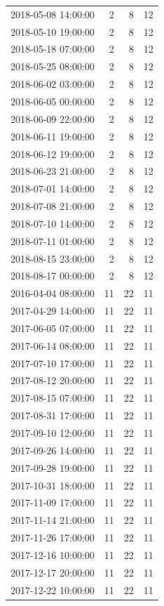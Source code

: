 \begin{tabular}{lrrr}
2018-05-08 14:00:00 & 2 & 8 & 12 \\
2018-05-10 19:00:00 & 2 & 8 & 12 \\
2018-05-18 07:00:00 & 2 & 8 & 12 \\
2018-05-25 08:00:00 & 2 & 8 & 12 \\
2018-06-02 03:00:00 & 2 & 8 & 12 \\
2018-06-05 00:00:00 & 2 & 8 & 12 \\
2018-06-09 22:00:00 & 2 & 8 & 12 \\
2018-06-11 19:00:00 & 2 & 8 & 12 \\
2018-06-12 19:00:00 & 2 & 8 & 12 \\
2018-06-23 21:00:00 & 2 & 8 & 12 \\
2018-07-01 14:00:00 & 2 & 8 & 12 \\
2018-07-08 21:00:00 & 2 & 8 & 12 \\
2018-07-10 14:00:00 & 2 & 8 & 12 \\
2018-07-11 01:00:00 & 2 & 8 & 12 \\
2018-08-15 23:00:00 & 2 & 8 & 12 \\
2018-08-17 00:00:00 & 2 & 8 & 12 \\
2016-04-04 08:00:00 & 11 & 22 & 11 \\
2017-04-29 14:00:00 & 11 & 22 & 11 \\
2017-06-05 07:00:00 & 11 & 22 & 11 \\
2017-06-14 08:00:00 & 11 & 22 & 11 \\
2017-07-10 17:00:00 & 11 & 22 & 11 \\
2017-08-12 20:00:00 & 11 & 22 & 11 \\
2017-08-15 07:00:00 & 11 & 22 & 11 \\
2017-08-31 17:00:00 & 11 & 22 & 11 \\
2017-09-10 12:00:00 & 11 & 22 & 11 \\
2017-09-26 14:00:00 & 11 & 22 & 11 \\
2017-09-28 19:00:00 & 11 & 22 & 11 \\
2017-10-31 18:00:00 & 11 & 22 & 11 \\
2017-11-09 17:00:00 & 11 & 22 & 11 \\
2017-11-14 21:00:00 & 11 & 22 & 11 \\
2017-11-26 17:00:00 & 11 & 22 & 11 \\
2017-12-16 10:00:00 & 11 & 22 & 11 \\
2017-12-17 20:00:00 & 11 & 22 & 11 \\
2017-12-22 10:00:00 & 11 & 22 & 11 \\

\end{tabular}
